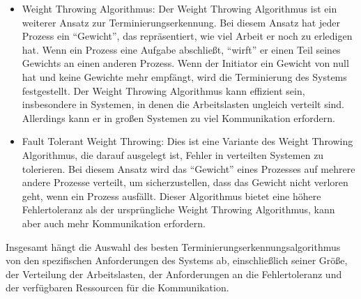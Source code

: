 \begin{itemize}
\item Weight Throwing Algorithmus: Der Weight Throwing Algorithmus ist ein weiterer Ansatz zur Terminierungserkennung. Bei diesem Ansatz hat jeder Prozess ein \enquote{Gewicht}, das repräsentiert, wie viel Arbeit er noch zu erledigen hat. Wenn ein Prozess eine Aufgabe abschließt, \enquote{wirft} er einen Teil seines Gewichts an einen anderen Prozess. Wenn der Initiator ein Gewicht von null hat und keine Gewichte mehr empfängt, wird die Terminierung des Systems festgestellt. Der Weight Throwing Algorithmus kann effizient sein, insbesondere in Systemen, in denen die Arbeitslasten ungleich verteilt sind. Allerdings kann er in großen Systemen zu viel Kommunikation erfordern.
\item Fault Tolerant Weight Throwing: Dies ist eine Variante des Weight Throwing Algorithmus, die darauf ausgelegt ist, Fehler in verteilten Systemen zu tolerieren. Bei diesem Ansatz wird das \enquote{Gewicht} eines Prozesses auf mehrere andere Prozesse verteilt, um sicherzustellen, dass das Gewicht nicht verloren geht, wenn ein Prozess ausfällt. Dieser Algorithmus bietet eine höhere Fehlertoleranz als der ursprüngliche Weight Throwing Algorithmus, kann aber auch mehr Kommunikation erfordern.
\end{itemize}
Insgesamt hängt die Auswahl des besten Terminierungserkennungsalgorithmus von den spezifischen Anforderungen des Systems ab, einschließlich seiner Größe, der Verteilung der Arbeitslasten, der Anforderungen an die Fehlertoleranz und der verfügbaren Ressourcen für die Kommunikation.

